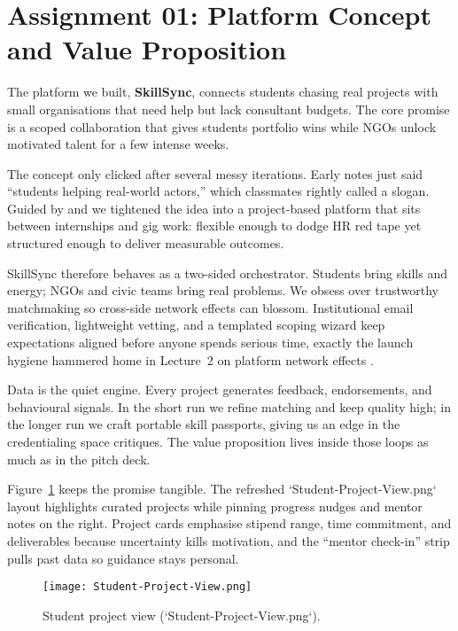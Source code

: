 \section*{Assignment 01: Platform Concept and Value Proposition}

The platform we built, \textbf{SkillSync}, connects students chasing real projects with small organisations that need help but lack consultant budgets. The core promise is a scoped collaboration that gives students portfolio wins while NGOs unlock motivated talent for a few intense weeks.

The concept only clicked after several messy iterations. Early notes just said ``students helping real-world actors,'' which classmates rightly called a slogan. Guided by \citet{Choudary2016} and \citet{Srnicek2017} we tightened the idea into a project-based platform that sits between internships and gig work: flexible enough to dodge HR red tape yet structured enough to deliver measurable outcomes.

SkillSync therefore behaves as a two-sided orchestrator. Students bring skills and energy; NGOs and civic teams bring real problems. We obsess over trustworthy matchmaking so cross-side network effects can blossom. Institutional email verification, lightweight vetting, and a templated scoping wizard keep expectations aligned before anyone spends serious time, exactly the launch hygiene hammered home in Lecture~2 on platform network effects \citep{Lecture02}.

Data is the quiet engine. Every project generates feedback, endorsements, and behavioural signals. In the short run we refine matching and keep quality high; in the longer run we craft portable skill passports, giving us an edge in the credentialing space \citet{Zuboff2019} critiques. The value proposition lives inside those loops as much as in the pitch deck.

Figure~\ref{fig:student-view} keeps the promise tangible. The refreshed `Student-Project-View.png` layout highlights curated projects while pinning progress nudges and mentor notes on the right. Project cards emphasise stipend range, time commitment, and deliverables because uncertainty kills motivation, and the ``mentor check-in'' strip pulls past data so guidance stays personal.

\begin{figure}[H]
  \centering
  \texttt{[image: Student-Project-View.png]}
  \caption{Student project view (`Student-Project-View.png`).}
  \label{fig:student-view}
\end{figure}

